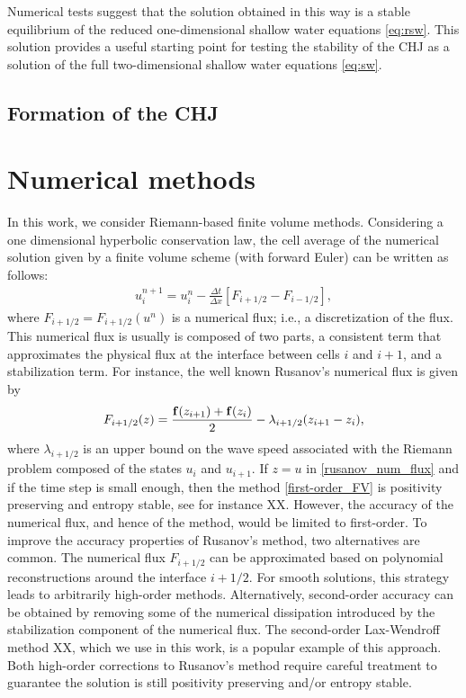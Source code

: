 \documentclass[preprint, 11pt]{article}
\newcommand{\bff}{{\bf f}}
\begin{document}
Numerical tests suggest that the solution obtained in this way is a stable equilibrium
of the reduced one-dimensional shallow water equations \eqref{eq:rsw}.  This
solution provides a useful starting point for testing the stability of the CHJ
as a solution of the full two-dimensional shallow water equations \eqref{eq:sw}.

\subsection{Formation of the CHJ}

\section{Numerical methods}
In this work, we consider Riemann-based finite volume methods.
Considering a one dimensional hyperbolic conservation law,
the cell average of the numerical solution given by a finite volume scheme (with forward Euler) 
can be written as follows:
\begin{align}\label{first-order_FV}
  u_i^{n+1}=u_i^n-\frac{\Delta t}{\Delta x}\left[F_{i+1/2}-F_{i-1/2}\right],
\end{align}
where $F_{i+1/2}=F_{i+1/2}(u^n)$ is a numerical flux; i.e., a discretization of the flux. 
This numerical flux is usually is composed of two parts, a consistent term that approximates 
the physical flux at the interface between cells $i$ and $i+1$, and a stabilization term. 
For instance, the well known Rusanov's numerical flux is given by 
\begin{align}\label{rusanov_num_flux}
  F_{i+1/2}(z)=\frac{\bff(z_{i+1})+\bff(z_i)}{2} - \lambda_{i+1/2}(z_{i+1}-z_i),
\end{align}
where $\lambda_{i+1/2}$ is an upper bound on the wave speed associated with the Riemann problem 
composed of the states $u_i$ and $u_{i+1}$. 
If $z=u$ in \eqref{rusanov_num_flux}
and if the time step is small enough, 
then the method \eqref{first-order_FV} is positivity preserving and entropy stable, see for instance XX. 
However, the accuracy of the numerical flux, and hence of the method, would be 
limited to first-order. To improve the accuracy properties of Rusanov's method, 
two alternatives are common. 
The numerical flux $F_{i+1/2}$ can be approximated based on polynomial 
reconstructions around the interface $i+1/2$. 
For smooth solutions, this strategy leads to arbitrarily high-order
methods. Alternatively, second-order accuracy can be obtained by removing some of the 
numerical dissipation introduced by the stabilization component of the numerical flux. 
The second-order Lax-Wendroff method XX, which we use in this work, 
is a popular example of this approach. 
Both high-order corrections to Rusanov's method require careful treatment to guarantee 
the solution is still positivity preserving and/or entropy stable. 
\end{document}
